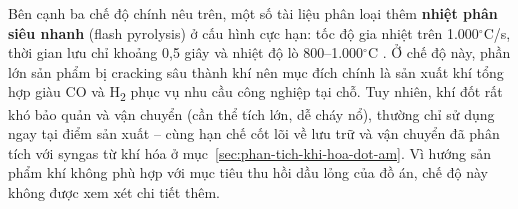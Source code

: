 \documentclass[../main.tex]{subfiles}
\begin{document}
\begin{table}[htbp]
\centering
\caption{So sánh các chế độ nhiệt phân theo tốc độ gia nhiệt}
\label{tab:so-sanh-che-do-nhiet-phan}
\setlength{\tabcolsep}{4pt}
\end{table}

Bên cạnh ba chế độ chính nêu trên, một số tài liệu phân loại thêm \textbf{nhiệt phân siêu nhanh} (flash pyrolysis) ở cấu hình cực hạn: tốc độ gia nhiệt trên 1.000$^{\circ}$C/s, thời gian lưu chỉ khoảng 0{,}5 giây và nhiệt độ lò 800--1.000$^{\circ}$C \cite{Bridgwater2012}. Ở chế độ này, phần lớn sản phẩm bị cracking sâu thành khí nên mục đích chính là sản xuất khí tổng hợp giàu CO và H\textsubscript{2} phục vụ nhu cầu công nghiệp tại chỗ. Tuy nhiên, khí đốt rất khó bảo quản và vận chuyển (cần thể tích lớn, dễ cháy nổ), thường chỉ sử dụng ngay tại điểm sản xuất -- cùng hạn chế cốt lõi về lưu trữ và vận chuyển đã phân tích với syngas từ khí hóa ở mục~\ref{sec:phan-tich-khi-hoa-dot-am}. Vì hướng sản phẩm khí không phù hợp với mục tiêu thu hồi dầu lỏng của đồ án, chế độ này không được xem xét chi tiết thêm.
\end{document}
